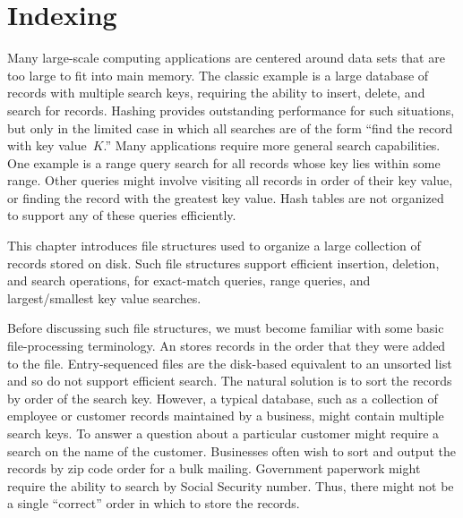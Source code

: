 
\chapter{Indexing}
\label{Indexing}
\def\CHHEAD{Chap.\ \thechapter\ Indexing}    %

Many large-scale computing applications are centered around data sets
that are too large to fit into main memory.
The classic example is a large database of records with multiple
search keys, requiring the ability to insert, delete, and search for
records.
Hashing provides outstanding performance for such
situations, but only in the limited case in which all searches are of
the form ``find the record with
key value~\(K\).''
Many applications require more general search capabilities.
One example is a range query
search for all records whose key lies within some range.
Other queries might involve visiting all records in order of their key
value, or finding the record with the greatest key value.
Hash tables are not organized to support any of these queries
efficiently.

This chapter introduces file structures used to organize a large
collection of records stored on disk.
Such file structures support efficient insertion,
deletion, and search operations, for exact-match queries, range
queries, and largest/smallest key value searches.

Before discussing such file structures, we must become familiar
with some basic file-processing terminology.
An 
stores records in the order that they were added to the file.
Entry-sequenced files are the disk-based equivalent to an unsorted
list and so do not support efficient search.
The natural solution is to sort the records by order of the search key.
However, a typical database, such as a collection of employee or
customer records maintained by a business, might contain multiple
search keys.
To answer a question about a particular customer might require a
search on the name of the customer.
Businesses often wish to sort and output the records by
zip code order for a bulk mailing.
Government paperwork might require the ability to search by
Social Security number.
Thus, there might not be a single ``correct'' order in which to store
the records.

